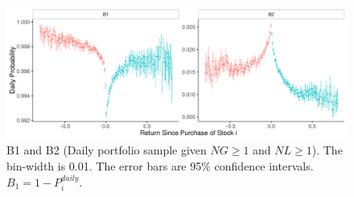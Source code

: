 \documentclass[11pt, a4paper]{article}
\begin{document}
\begin{appendices}
\begin{figure}[H]
	\centering
	\includegraphics[width=1\columnwidth]{barc_B12_NG1_NL1_3.pdf}
	\caption{\small B1 and B2 (Daily portfolio sample given $NG\geq1$ and $NL\geq1$). The bin-width is 0.01. The error bars are 95\% confidence intervals. $B_{1}=1-P^{daily}_{i}$.}
	\label{figure:prop_B12_NG1NL1}
\end{figure}

\end{appendices}

\pagebreak


\end{document}
